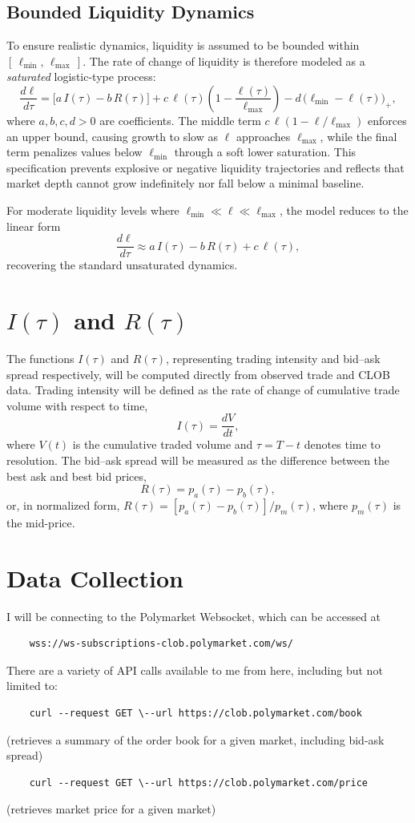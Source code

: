 \documentclass{article}
\begin{document}
\subsection*{Bounded Liquidity Dynamics}

To ensure realistic dynamics, liquidity is assumed to be bounded within \([\,\ell_{\min},\,\ell_{\max}\,]\). 
The rate of change of liquidity is therefore modeled as a \emph{saturated} logistic-type process:
\[
\frac{d\ell}{d\tau} = \big[a\,I(\tau) - b\,R(\tau)\big] 
+ c\,\ell(\tau)\!\left(1 - \frac{\ell(\tau)}{\ell_{\max}}\right)
- d\,\big(\ell_{\min} - \ell(\tau)\big)_{+},
\]
where \(a,b,c,d>0\) are coefficients. 
The middle term \(c\,\ell(1 - \ell/\ell_{\max})\) enforces an upper bound, causing growth to slow as \(\ell\) approaches \(\ell_{\max}\), while the final term penalizes values below \(\ell_{\min}\) through a soft lower saturation. 
This specification prevents explosive or negative liquidity trajectories and reflects that market depth cannot grow indefinitely nor fall below a minimal baseline.

For moderate liquidity levels where \(\ell_{\min} \ll \ell \ll \ell_{\max}\), the model reduces to the linear form
\[
\frac{d\ell}{d\tau} \approx a\,I(\tau) - b\,R(\tau) + c\,\ell(\tau),
\]
recovering the standard unsaturated dynamics.

\section*{\(I(\tau)\) and \(R(\tau)\)}

The functions \(I(\tau)\) and \(R(\tau)\), representing trading intensity and bid--ask spread respectively, will be computed directly from observed trade and CLOB data. 
Trading intensity will be defined as the rate of change of cumulative trade volume with respect to time,
\[
I(\tau) = \frac{dV}{dt},
\]
where \(V(t)\) is the cumulative traded volume and \(\tau = T - t\) denotes time to resolution. 
The bid--ask spread will be measured as the difference between the best ask and best bid prices,
\[
R(\tau) = p_a(\tau) - p_b(\tau),
\]
or, in normalized form, \(R(\tau) = [p_a(\tau) - p_b(\tau)] / p_m(\tau)\), where \(p_m(\tau)\) is the mid-price. 

\section*{Data Collection}
I will be connecting to the Polymarket Websocket, which can be accessed at 
\begin{verbatim}
    wss://ws-subscriptions-clob.polymarket.com/ws/
\end{verbatim}
There are a variety of API calls available to me from here, including but not limited to:
\begin{verbatim}
    curl --request GET \--url https://clob.polymarket.com/book
\end{verbatim} (retrieves a summary of the order book for a given market, including bid-ask spread)
\begin{verbatim}
    curl --request GET \--url https://clob.polymarket.com/price
\end{verbatim}
(retrieves market price for a given market)
\end{document}
